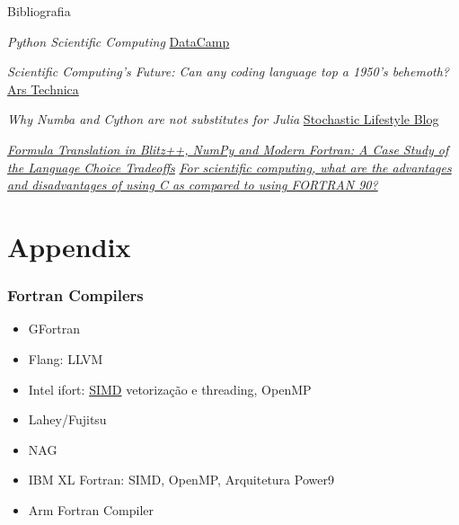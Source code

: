 \documentclass{beamer}
\begin{document}
\begin{darkframes}
\begin{frame}[label=bibliography, allowframebreaks]{Bibliografia}
{\begin{thebibliography}{99}
     \emph{Python Scientific Computing} \href{https://www.datacamp.com/community/blog/python-scientific-computing-case}{DataCamp}
       
     \emph{Scientific Computing's Future: Can any coding language top a 1950's behemoth?} \href{https://arstechnica.com/science/2014/05/scientific-computings-future-can-any-coding-language-top-a-1950s-behemoth/}{Ars Technica}
    
     \emph{Why Numba and Cython are not substitutes for Julia} \href{http://www.stochasticlifestyle.com/why-numba-and-cython-are-not-substitutes-for-julia}{Stochastic Lifestyle Blog}
    
     \href{https://www.hindawi.com/journals/sp/2014/870146/abs/}{\emph{Formula Translation in Blitz++, NumPy and Modern Fortran: A Case Study of the Language Choice Tradeoffs}}
     \href{https://www.quora.com/For-scientific-computing-what-are-the-advantages-and-disadvantages-of-using-C-as-compared-to-using-FORTRAN-90}{\emph{For scientific computing, what are the advantages and disadvantages of using C as compared to using FORTRAN 90?}}
    \end{thebibliography}
    }
  \end{frame}
  
  \section{Appendix}
  
  \begin{frame}[label=compilers, noframenumbering]
    \frametitle{Fortran Compilers}
    \begin{itemize}
    \item GFortran
    \item Flang: LLVM
    \item Intel ifort: \href{https://en.wikipedia.org/wiki/SIMD}{SIMD} vetorização e threading, OpenMP
    \item Lahey/Fujitsu
    \item NAG
    \item IBM XL Fortran: SIMD, OpenMP, Arquitetura Power9
    \item Arm Fortran Compiler
    \end{itemize}
    \hyperlink{features}{}
  \end{frame}
  

\end{darkframes}
\end{document}
